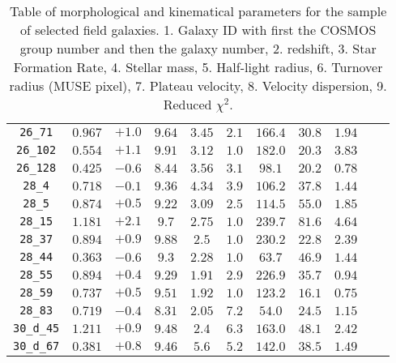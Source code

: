 \begin{table}[htbp]
\begin{tabular}{c c c c c c c c c c c}
\texttt{26\_71}         & $0.967$ & $+1.0$ & $9.64 $ & $3.45 $ & $2.1 $ & $166.4$ & $30.8$ & $1.94$ \\
\texttt{26\_102}        & $0.554$ & $+1.1$ & $9.91 $ & $3.12 $ & $1.0 $ & $182.0$ & $20.3$ & $3.83$ \\
\texttt{26\_128}        & $0.425$ & $-0.6$ & $8.44 $ & $3.56 $ & $3.1 $ & $98.1 $ & $20.2$ & $0.78$ \\
\texttt{28\_4}          & $0.718$ & $-0.1$ & $9.36 $ & $4.34 $ & $3.9 $ & $106.2$ & $37.8$ & $1.44$ \\
\texttt{28\_5}          & $0.874$ & $+0.5$ & $9.22 $ & $3.09 $ & $2.5 $ & $114.5$ & $55.0$ & $1.85$ \\
\texttt{28\_15}         & $1.181$ & $+2.1$ & $9.7  $ & $2.75 $ & $1.0 $ & $239.7$ & $81.6$ & $4.64$ \\
\texttt{28\_37}         & $0.894$ & $+0.9$ & $9.88 $ & $2.5  $ & $1.0 $ & $230.2$ & $22.8$ & $2.39$ \\
\texttt{28\_44}         & $0.363$ & $-0.6$ & $9.3  $ & $2.28 $ & $1.0 $ & $63.7 $ & $46.9$ & $1.44$ \\
\texttt{28\_55}         & $0.894$ & $+0.4$ & $9.29 $ & $1.91 $ & $2.9 $ & $226.9$ & $35.7$ & $0.94$ \\
\texttt{28\_59}         & $0.737$ & $+0.5$ & $9.51 $ & $1.92 $ & $1.0 $ & $123.2$ & $16.1$ & $0.75$ \\
\texttt{28\_83}         & $0.719$ & $-0.4$ & $8.31 $ & $2.05 $ & $7.2 $ & $54.0 $ & $24.5$ & $1.15$ \\
\texttt{30\_d\_45}      & $1.211$ & $+0.9$ & $9.48 $ & $2.4  $ & $6.3 $ & $163.0$ & $48.1$ & $2.42$ \\
\texttt{30\_d\_67}      & $0.381$ & $+0.8$ & $9.46 $ & $5.6  $ & $5.2 $ & $142.0$ & $38.5$ & $1.49$ \\


	\end{tabular}
	\caption[Morpho-kinematical parameters I]{Table of morphological and kinematical parameters for the sample of selected field galaxies. 1. Galaxy ID with first the COSMOS group number and then the galaxy number, 2. redshift, 3. Star Formation Rate, 4. Stellar mass, 5. Half-light radius, 6. Turnover radius (MUSE pixel), 7. Plateau velocity, 8. Velocity dispersion, 9. Reduced $\chi^2$.}
\label{table:params1}
\end{table}



